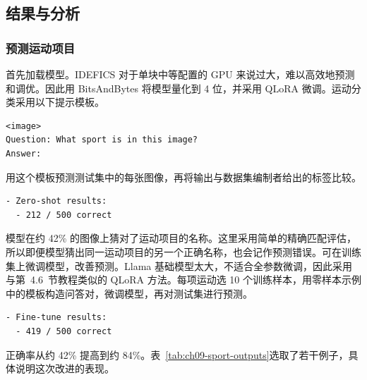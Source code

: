 \subsection{结果与分析}
\subsubsection{预测运动项目}
首先加载模型。IDEFICS 对于单块中等配置的 GPU 来说过大，难以高效地预测和调优。因此用 BitsAndBytes 将模型量化到 4 位，并采用 QLoRA 微调。运动分类采用以下提示模板。

\noindent\begin{minipage}{\linewidth}
\begin{lstlisting}[caption={运动项目分类提示。},label={lst:ch09-sport-prompt}]
<image>
Question: What sport is in this image?
Answer:
\end{lstlisting}
\end{minipage}\par

用这个模板预测测试集中的每张图像，再将输出与数据集编制者给出的标签比较。

\noindent\begin{minipage}{\linewidth}
\begin{lstlisting}[caption={测试集零样本预测结果。},label={lst:ch09-sport-zero}]
- Zero-shot results:
  - 212 / 500 correct
\end{lstlisting}
\end{minipage}\par

模型在约 42\% 的图像上猜对了运动项目的名称。这里采用简单的精确匹配评估，所以即便模型猜出同一运动项目的另一个正确名称，也会记作预测错误。可在训练集上微调模型，改善预测。Llama 基础模型太大，不适合全参数微调，因此采用与第~4.6~节教程类似的 QLoRA 方法。每项运动选 10 个训练样本，用零样本示例中的模板构造问答对，微调模型，再对测试集进行预测。

\noindent\begin{minipage}{\linewidth}
\begin{lstlisting}[caption={微调后的测试集预测结果。},label={lst:ch09-sport-tuned}]
- Fine-tune results:
  - 419 / 500 correct
\end{lstlisting}
\end{minipage}\par

正确率从约 42\% 提高到约 84\%。表~\ref{tab:ch09-sport-outputs}选取了若干例子，具体说明这次改进的表现。


